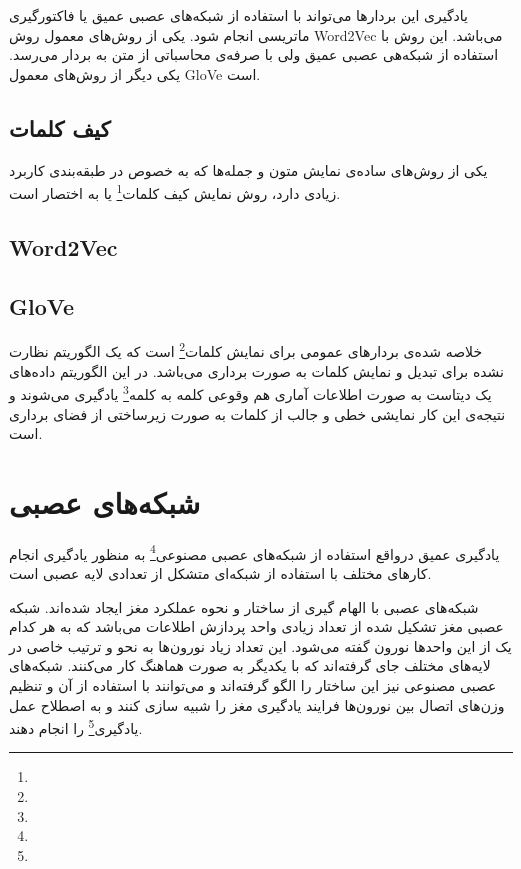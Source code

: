 \documentclass[12pt, a4paper, oneside]{report}
\begin{document}
یادگیری این بردار‌ها می‌تواند با استفاده از شبکه‌های عصبی عمیق یا فاکتورگیری ماتریسی انجام شود. یکی از روش‌های معمول روش‌
Word2Vec
می‌باشد. این روش با استفاده از شبکه‌هی عصبی عمیق ولی با صرفه‌ی محاسباتی از متن به بردار می‌رسد. یکی دیگر از روش‌های معمول
GloVe
است.
\cite{zhang2018deep}

\subsection{کیف کلمات}

یکی از روش‌های ساده‌ی نمایش متون و جمله‌ها که به خصوص در طبقه‌بندی کاربرد زیادی دارد، روش نمایش
کیف کلمات\footnote{}
یا به اختصار
است.

\subsection{}

\subsection{Word2Vec}

\subsection{GloVe}

خلاصه شده‌ی 
بردارهای عمومی برای نمایش کلمات\footnote{}
است که یک الگوریتم نظارت نشده برای تبدیل و نمایش کلمات به صورت برداری می‌باشد.
در این الگوریتم داده‌های یک دیتاست به صورت اطلاعات آماری 
هم وقوعی کلمه به کلمه\footnote{}
یادگیری می‌شوند و نتیجه‌ی این کار نمایشی خطی و جالب از کلمات
به صورت زیرساختی از فضای برداری است\cite{8844895}.

\section{شبکه‌های عصبی}

یادگیری عمیق درواقع استفاده از 
شبکه‌های عصبی مصنوعی\footnote{}
به منظور یادگیری انجام کارهای مختلف
با استفاده از شبکه‌ای متشکل از تعدادی لایه عصبی است.

شبکه‌های عصبی با الهام گیری از ساختار و نحوه عملکرد مغز ایجاد شده‌اند. شبکه عصبی مغز تشکیل شده
از تعداد زیادی واحد پردازش اطلاعات می‌باشد که به هر کدام یک از این واحدها نورون گفته می‌شود.
این تعداد زیاد نورون‌ها به نحو و ترتیب خاصی در لایه‌های مختلف جای گرفته‌اند که با یکدیگر به صورت
هماهنگ کار می‌کنند. شبکه‌های عصبی مصنوعی نیز این ساختار را الگو گرفته‌اند و می‌توانند با استفاده از آن‌
و تنظیم وزن‌های اتصال بین نورون‌ها فرایند یادگیری مغز را شبیه سازی کنند و به اصطلاح عمل
یادگیری\footnote{}
را انجام دهند.
\end{document}
